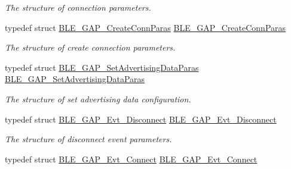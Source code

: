\begin{DoxyCompactItemize}
\begin{DoxyCompactList}\small\item\em The structure of connection parameters. \end{DoxyCompactList}\item 
typedef struct \hyperlink{struct_b_l_e___g_a_p___create_conn_paras}{B\+L\+E\+\_\+\+G\+A\+P\+\_\+\+Create\+Conn\+Paras} \hyperlink{group___b_l_e___g_a_p_ga124b2e466f84609d46328b581f41aeac}{B\+L\+E\+\_\+\+G\+A\+P\+\_\+\+Create\+Conn\+Paras}\hypertarget{group___b_l_e___g_a_p_ga124b2e466f84609d46328b581f41aeac}{}\label{group___b_l_e___g_a_p_ga124b2e466f84609d46328b581f41aeac}

\begin{DoxyCompactList}\small\item\em The structure of create connection parameters. \end{DoxyCompactList}\item 
typedef struct \hyperlink{struct_b_l_e___g_a_p___set_advertising_data_paras}{B\+L\+E\+\_\+\+G\+A\+P\+\_\+\+Set\+Advertising\+Data\+Paras} \hyperlink{group___b_l_e___g_a_p_ga63fd9639d755da8a34b44946cf4db6ac}{B\+L\+E\+\_\+\+G\+A\+P\+\_\+\+Set\+Advertising\+Data\+Paras}\hypertarget{group___b_l_e___g_a_p_ga63fd9639d755da8a34b44946cf4db6ac}{}\label{group___b_l_e___g_a_p_ga63fd9639d755da8a34b44946cf4db6ac}

\begin{DoxyCompactList}\small\item\em The structure of set advertising data configuration. \end{DoxyCompactList}\item 
typedef struct \hyperlink{struct_b_l_e___g_a_p___evt___disconnect}{B\+L\+E\+\_\+\+G\+A\+P\+\_\+\+Evt\+\_\+\+Disconnect} \hyperlink{group___b_l_e___g_a_p_ga17024790c30f38d90f081f4e6f2592ea}{B\+L\+E\+\_\+\+G\+A\+P\+\_\+\+Evt\+\_\+\+Disconnect}\hypertarget{group___b_l_e___g_a_p_ga17024790c30f38d90f081f4e6f2592ea}{}\label{group___b_l_e___g_a_p_ga17024790c30f38d90f081f4e6f2592ea}

\begin{DoxyCompactList}\small\item\em The structure of disconnect event parameters. \end{DoxyCompactList}\item 
typedef struct \hyperlink{struct_b_l_e___g_a_p___evt___connect}{B\+L\+E\+\_\+\+G\+A\+P\+\_\+\+Evt\+\_\+\+Connect} \hyperlink{group___b_l_e___g_a_p_ga73f9b51a4e43f3edf373d4c062a27cf1}{B\+L\+E\+\_\+\+G\+A\+P\+\_\+\+Evt\+\_\+\+Connect}\hypertarget{group___b_l_e___g_a_p_ga73f9b51a4e43f3edf373d4c062a27cf1}{}\label{group___b_l_e___g_a_p_ga73f9b51a4e43f3edf373d4c062a27cf1}


\end{DoxyCompactItemize}
